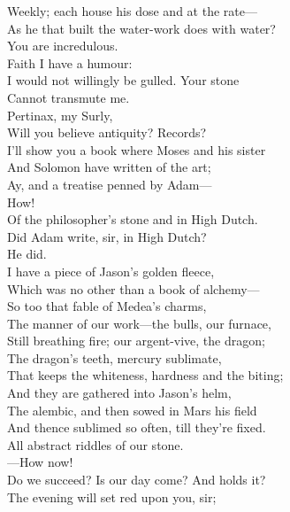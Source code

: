 \documentclass[a4paper,oneside,12pt]{memoir}
\begin{document}
\begin{drama*}
Weekly; each house his dose and at the rate---\\
\surlyspeaks As he that built the water-work does with water?\\
\mammonspeaks You are incredulous.\\
\surlyspeaks {} Faith I have a humour:\\
I would not willingly be gulled. Your stone\\
Cannot transmute me.\\
\mammonspeaks {} Pertinax, my Surly,\\
Will you believe antiquity? Records?\\
I'll show you a book where Moses and his sister\\
And Solomon have written of the art;\\
Ay, and a treatise penned by Adam---\\
\surlyspeaks {} How!\\
\mammonspeaks Of the philosopher's stone and in High Dutch.\\
\surlyspeaks Did Adam write, sir, in High Dutch?\\
\mammonspeaks {} He did.\\
I have a piece of Jason's golden fleece,\\
Which was no other than a book of alchemy---\\
So too that fable of Medea's charms,\\
The manner of our work---the bulls, our furnace,\\
Still breathing fire; our argent-vive, the dragon;\\
The dragon's teeth, mercury sublimate,\\
That keeps the whiteness, hardness and the biting;\\
And they are gathered into Jason's helm,\\
The alembic, and then sowed in Mars his field\\
And thence sublimed so often, till they're fixed.\\
All abstract riddles of our stone.\\
 ---How now!\\
Do we succeed? Is our day come? And holds it?\\
\facespeaks The evening will set red upon you, sir;\\

\end{drama*}
\end{document}
